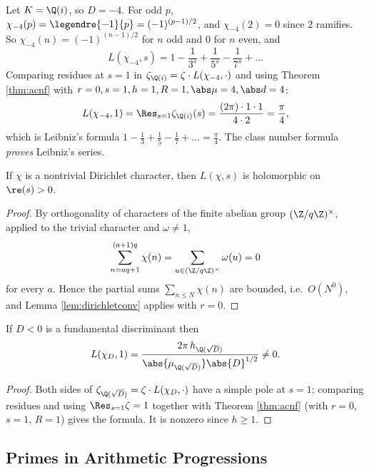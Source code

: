 \begin{example}
	Let $K = \Q(i)$, so $D = -4$. For odd $p$, $\chi_{-4}(p) = \legendre{-1}{p} = (-1)^{(p-1)/2}$, and $\chi_{-4}(2) = 0$ since $2$ ramifies. So $\chi_{-4}(n) = (-1)^{(n-1)/2}$ for $n$ odd and $0$ for $n$ even, and
	$$L(\chi_{-4},s) = 1-\frac1{3^s}+\frac1{5^s}-\frac1{7^s}+\dots$$
	Comparing residues at $s = 1$ in $\zeta_{\Q(i)} = \zeta\cdot L(\chi_{-4},\cdot)$ and using Theorem \ref{thm:acnf} with $r=0,s=1,h=1,R=1,\abs\mu = 4,\abs d = 4$:
	$$L(\chi_{-4},1) = \Res_{s=1}\zeta_{\Q(i)}(s) = \frac{(2\pi)\cdot 1\cdot 1}{4\cdot 2} = \frac\pi4,$$
	which is Leibniz's formula $1-\tfrac13+\tfrac15-\tfrac17+\dots = \tfrac\pi4$. The class number formula \emph{proves} Leibniz's series.
\end{example}

\begin{lemma}\label{lem:Lnontrivial}
	If $\chi$ is a nontrivial Dirichlet character, then $L(\chi,s)$ is holomorphic on $\re(s)>0$.
\end{lemma}

\begin{proof}
	By orthogonality of characters of the finite abelian group $(\Z/q\Z)^\times$, applied to the trivial character and $\omega \neq 1$,
	$$\sum_{n = aq+1}^{(a+1)q}\chi(n) = \sum_{u \in (\Z/q\Z)^\times}\omega(u) = 0$$
	for every $a$. Hence the partial sums $\sum_{n\le N}\chi(n)$ are bounded, i.e.\ $O(N^0)$, and Lemma \ref{lem:dirichletconv} applies with $r = 0$.
\end{proof}

\begin{corollary}
	If $D < 0$ is a fundamental discriminant then
	$$L(\chi_D,1) = \frac{2\pi\, h_{\Q(\sqrt D)}}{\abs{\mu_{\Q(\sqrt D)}}\abs{D}^{1/2}} \neq 0.$$
\end{corollary}

\begin{proof}
	Both sides of $\zeta_{\Q(\sqrt D)} = \zeta\cdot L(\chi_D,\cdot)$ have a simple pole at $s=1$; comparing residues and using $\Res_{s=1}\zeta = 1$ together with Theorem \ref{thm:acnf} (with $r=0$, $s=1$, $R = 1$) gives the formula. It is nonzero since $h \geq 1$.
\end{proof}

\subsection{Primes in Arithmetic Progressions}

